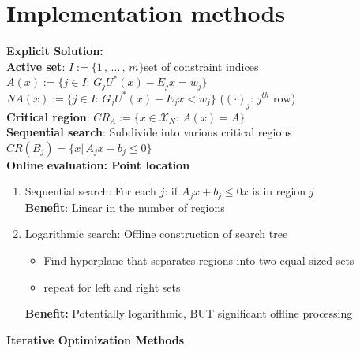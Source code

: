 \section{Implementation methods}
\vspace{0.5em}
\textbf{Explicit Solution:}\\
\textbf{Active set}:
$I:=\{1\,,\,...\,,\,m\}$\rightarrow set of constraint indices\\
$A(x):=\{j\in I:\,G_jU^*(x)-E_jx=w_j\}$\\
$NA(x):=\{j\in I:\,G_jU^*(x)-E_jx<w_j\}$ ($(\cdot)_j:\,j^{th}\text{ row}$)\\
\textbf{Critical region}:
$CR_A:=\{x\in\mathcal{X}_N:\,A(x)=A\}$\\
\textbf{Sequential search}:
Subdivide into various critical regions $CR(B_j)=\{x|\,A_jx+b_j\leq0\}$\\
\textbf{Online evaluation: Point location}
\begin{enumerate}
    \item Sequential search: For each $j$: if $A_jx+b_j\leq0$\rightarrow $x$ is in region $j$\\
\textbf{Benefit}: Linear in the number of regions
\item Logarithmic search: Offline construction of search tree
\begin{itemize}
    \item Find hyperplane that separates regions into two equal sized sets 
    \item repeat for left and right sets
\end{itemize}
\textbf{Benefit:} Potentially logarithmic, BUT significant offline processing
\end{enumerate}
\textbf{Iterative Optimization Methods}
